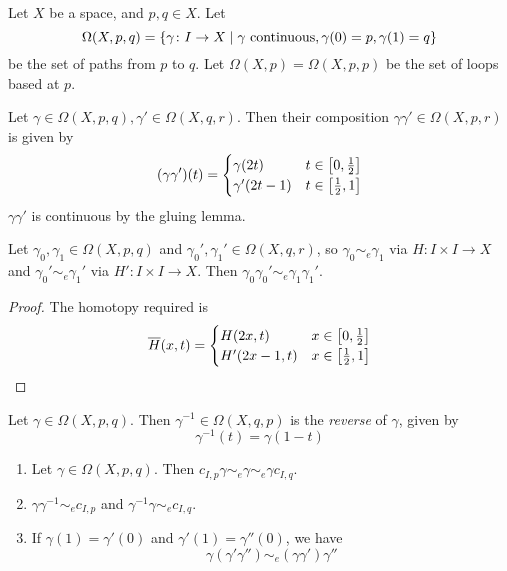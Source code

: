 \begin{definition}
	Let \( X \) be a space, and \( p, q \in X \).
	Let
	\[ \Omega(X,p,q) = \qty{\gamma \colon I \to X \mid \gamma \text{ continuous}, \gamma(0) = p, \gamma(1) = q} \]
	be the set of paths from \( p \) to \( q \).
	Let \( \Omega(X,p) = \Omega(X,p,p) \) be the set of loops based at \( p \).
\end{definition}
\begin{definition}
	Let \( \gamma \in \Omega(X,p,q), \gamma' \in \Omega(X,q,r) \).
	Then their composition \( \gamma \gamma' \in \Omega(X,p,r) \) is given by
	\[ (\gamma\gamma')(t) = \begin{cases}
		\gamma(2t) & t \in \qty[0,\frac 12] \\
		\gamma'(2t-1) & t \in \qty[\frac 12, 1]
	\end{cases} \]
	\( \gamma\gamma' \) is continuous by the gluing lemma.
\end{definition}
\begin{lemma}
	Let \( \gamma_0, \gamma_1 \in \Omega(X,p,q) \) and \( \gamma_0', \gamma_1' \in \Omega(X,q,r) \), so \( \gamma_0 \sim_e \gamma_1 \) via \( H \colon I \times I \to X \) and \( \gamma_0' \sim_e \gamma_1' \) via \( H' \colon I \times I \to X \).
	Then \( \gamma_0 \gamma_0' \sim_e \gamma_1 \gamma_1' \).
\end{lemma}
\begin{proof}
	The homotopy required is
	\[ \overline H(x,t) = \begin{cases}
		H(2x,t) & x \in \qty[0,\frac 12] \\
		H'(2x-1,t) & x \in \qty[\frac 12, 1]
	\end{cases} \]
\end{proof}
\begin{definition}
	Let \( \gamma \in \Omega(X,p,q) \).
	Then \( \gamma^{-1} \in \Omega(X,q,p) \) is the \emph{reverse} of \( \gamma \), given by
	\[ \gamma^{-1}(t) = \gamma(1-t) \]
\end{definition}
\begin{proposition}
	\begin{enumerate}
		\item Let \( \gamma \in \Omega(X,p,q) \).
			Then \( c_{I,p} \gamma \sim_e \gamma \sim_e \gamma c_{I,q} \).
		\item \( \gamma \gamma^{-1} \sim_e c_{I,p} \) and \( \gamma^{-1} \gamma \sim_e c_{I,q} \).
		\item If \( \gamma(1) = \gamma'(0) \) and \( \gamma'(1) = \gamma''(0) \), we have
			\[ \gamma (\gamma' \gamma'') \sim_e (\gamma \gamma') \gamma'' \]
	\end{enumerate}
\end{proposition}
